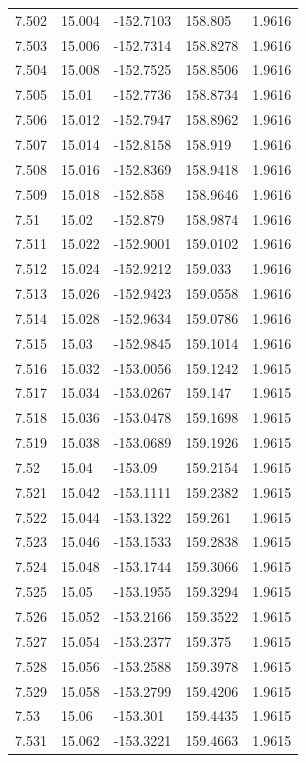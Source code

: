 \begin{tabular}{lllll}
7.502 & 15.004 & -152.7103 & 158.805 & 1.9616 \\
7.503 & 15.006 & -152.7314 & 158.8278 & 1.9616 \\
7.504 & 15.008 & -152.7525 & 158.8506 & 1.9616 \\
7.505 & 15.01 & -152.7736 & 158.8734 & 1.9616 \\
7.506 & 15.012 & -152.7947 & 158.8962 & 1.9616 \\
7.507 & 15.014 & -152.8158 & 158.919 & 1.9616 \\
7.508 & 15.016 & -152.8369 & 158.9418 & 1.9616 \\
7.509 & 15.018 & -152.858 & 158.9646 & 1.9616 \\
7.51 & 15.02 & -152.879 & 158.9874 & 1.9616 \\
7.511 & 15.022 & -152.9001 & 159.0102 & 1.9616 \\
7.512 & 15.024 & -152.9212 & 159.033 & 1.9616 \\
7.513 & 15.026 & -152.9423 & 159.0558 & 1.9616 \\
7.514 & 15.028 & -152.9634 & 159.0786 & 1.9616 \\
7.515 & 15.03 & -152.9845 & 159.1014 & 1.9616 \\
7.516 & 15.032 & -153.0056 & 159.1242 & 1.9615 \\
7.517 & 15.034 & -153.0267 & 159.147 & 1.9615 \\
7.518 & 15.036 & -153.0478 & 159.1698 & 1.9615 \\
7.519 & 15.038 & -153.0689 & 159.1926 & 1.9615 \\
7.52 & 15.04 & -153.09 & 159.2154 & 1.9615 \\
7.521 & 15.042 & -153.1111 & 159.2382 & 1.9615 \\
7.522 & 15.044 & -153.1322 & 159.261 & 1.9615 \\
7.523 & 15.046 & -153.1533 & 159.2838 & 1.9615 \\
7.524 & 15.048 & -153.1744 & 159.3066 & 1.9615 \\
7.525 & 15.05 & -153.1955 & 159.3294 & 1.9615 \\
7.526 & 15.052 & -153.2166 & 159.3522 & 1.9615 \\
7.527 & 15.054 & -153.2377 & 159.375 & 1.9615 \\
7.528 & 15.056 & -153.2588 & 159.3978 & 1.9615 \\
7.529 & 15.058 & -153.2799 & 159.4206 & 1.9615 \\
7.53 & 15.06 & -153.301 & 159.4435 & 1.9615 \\
7.531 & 15.062 & -153.3221 & 159.4663 & 1.9615 \\

\end{tabular}
